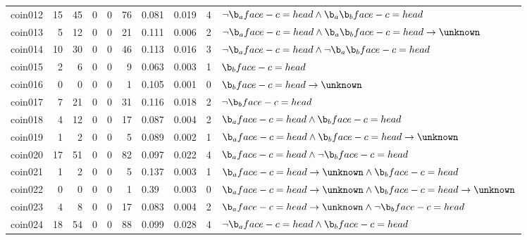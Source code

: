 \begin{tabular}{lrrrrrllrl}
coin012 & 15 & 45 & 0 & 0 & 76 & 0.081 & 0.019 & 4 & $\neg \b_a face-c=head \land \b_a \b_b face-c=head $ \\%
coin013 & 5 & 12 & 0 & 0 & 21 & 0.111 & 0.006 & 2 & $\neg \b_a face-c=head \land \b_a \b_b face-c=head  \rightarrow \unknown $ \\%
coin014 & 10 & 30 & 0 & 0 & 46 & 0.113 & 0.016 & 3 & $\neg \b_a face-c=head \land \neg \b_a \b_b face-c=head $ \\%
coin015 & 2 & 6 & 0 & 0 & 9 & 0.063 & 0.003 & 1 & $\b_b face-c=head $ \\%
coin016 & 0 & 0 & 0 & 0 & 1 & 0.105 & 0.001 & 0 & $\b_b face-c=head  \rightarrow \unknown $ \\%
coin017 & 7 & 21 & 0 & 0 & 31 & 0.116 & 0.018 & 2 & $\neg \b_b face-c=head $ \\%
coin018 & 4 & 12 & 0 & 0 & 17 & 0.087 & 0.004 & 2 & $\b_a face-c=head \land \b_b face-c=head $ \\%
coin019 & 1 & 2 & 0 & 0 & 5 & 0.089 & 0.002 & 1 & $\b_a face-c=head \land \b_b face-c=head  \rightarrow \unknown $ \\%
coin020 & 17 & 51 & 0 & 0 & 82 & 0.097 & 0.022 & 4 & $\b_a face-c=head \land \neg \b_b face-c=head $ \\%
coin021 & 1 & 2 & 0 & 0 & 5 & 0.137 & 0.003 & 1 & $\b_a face-c=head  \rightarrow \unknown \land \b_b face-c=head $ \\%
coin022 & 0 & 0 & 0 & 0 & 1 & 0.39 & 0.003 & 0 & $\b_a face-c=head  \rightarrow \unknown \land \b_b face-c=head  \rightarrow \unknown $ \\%
coin023 & 4 & 8 & 0 & 0 & 17 & 0.083 & 0.004 & 2 & $\b_a face-c=head  \rightarrow \unknown \land \neg \b_b face-c=head $ \\%
coin024 & 18 & 54 & 0 & 0 & 88 & 0.099 & 0.028 & 4 & $\neg \b_a face-c=head \land \b_b face-c=head $ \\%

\end{tabular}
